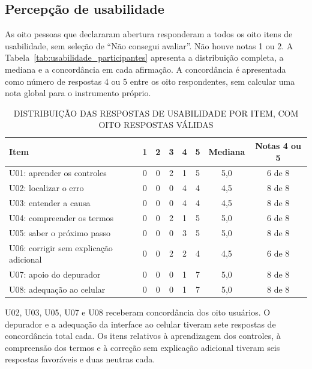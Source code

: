\documentclass[
    12pt
    ,oneside
    ,a4paper
    ,chapter=TITLE
    ,section=TITLE
    ,sumario=abnt-6027-2012]{abntex2}
\renewcommand{\legenda}[2][]{%
    \centering
    \caption[\MakeTextUppercase{#2}]{\maybeLabel{#1}\MakeTextUppercase{#2}}%
}
\begin{document}


\subsection{Percepção de usabilidade}
\label{sec:usabilidade_resultados}

As oito pessoas que declararam abertura responderam a todos os oito itens de usabilidade,
sem seleção de ``Não consegui avaliar''. Não houve notas 1 ou 2. A Tabela~\ref{tab:usabilidade_participantes} apresenta a distribuição completa, a mediana
e a concordância em cada afirmação. A concordância é apresentada como número de respostas 4 ou 5 entre os oito
respondentes, sem calcular uma nota global para o instrumento próprio.

\begin{table}[htb]
\centering
\legenda[tab:usabilidade_participantes]{Distribuição das respostas de usabilidade por item, com oito respostas válidas}
\small
\setlength{\tabcolsep}{4pt}
\begin{tabular}{P{5.4cm}ccccccc}
\toprule
Item & 1 & 2 & 3 & 4 & 5 & Mediana & Notas 4 ou 5 \\
\midrule
U01: aprender os controles & 0 & 0 & 2 & 1 & 5 & 5,0 & 6 de 8 \\
U02: localizar o erro & 0 & 0 & 0 & 4 & 4 & 4,5 & 8 de 8 \\
U03: entender a causa & 0 & 0 & 0 & 4 & 4 & 4,5 & 8 de 8 \\
U04: compreender os termos & 0 & 0 & 2 & 1 & 5 & 5,0 & 6 de 8 \\
U05: saber o próximo passo & 0 & 0 & 0 & 3 & 5 & 5,0 & 8 de 8 \\
U06: corrigir sem explicação adicional & 0 & 0 & 2 & 2 & 4 & 4,5 & 6 de 8 \\
U07: apoio do depurador & 0 & 0 & 0 & 1 & 7 & 5,0 & 8 de 8 \\
U08: adequação ao celular & 0 & 0 & 0 & 1 & 7 & 5,0 & 8 de 8 \\
\bottomrule
\end{tabular}
\vspace{0.2cm}
\end{table}
\FloatBarrier

U02, U03, U05, U07 e U08 receberam concordância dos oito usuários. O depurador e a
adequação da interface ao celular tiveram sete respostas de concordância total cada.
Os itens relativos à aprendizagem dos controles, à compreensão dos termos e à correção
sem explicação adicional tiveram seis respostas favoráveis e duas neutras cada.
\end{document}

